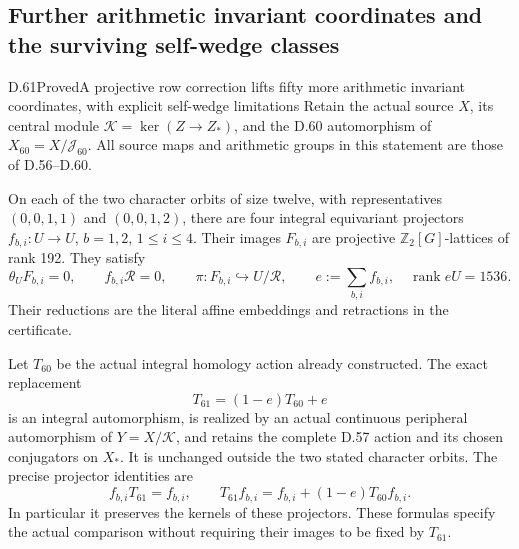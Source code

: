 \subsection{Further arithmetic invariant coordinates and the surviving self-wedge classes}

\begin{statement}{D.61}{Proved}{A projective row correction lifts fifty more arithmetic invariant coordinates, with explicit self-wedge limitations}
Retain the actual source \(X\), its central module
\(\mathcal K=\ker(Z\to Z_*)\), and the D.60
automorphism of \(X_{60}=X/\mathcal J_{60}\).
All source maps and arithmetic groups in this
statement are those of D.56--D.60.

On each of the two character orbits of size twelve,
with representatives \((0,0,1,1)\) and \((0,0,1,2)\),
there are four integral equivariant projectors
\(f_{b,i}:U\to U\), \(b=1,2\), \(1\leq i\leq4\).
Their images \(F_{b,i}\) are projective
\(\mathbb Z_2[G]\)-lattices of rank 192. They satisfy
\[
 \theta_UF_{b,i}=0,\qquad f_{b,i}\mathcal R=0,
 \qquad \pi:F_{b,i}\hookrightarrow U/\mathcal R,
 \qquad e:=\sum_{b,i}f_{b,i},\quad\operatorname{rank}eU=1536.
 \tag{D.61.1}
\]
Their reductions are the literal affine embeddings
and retractions in the certificate.

Let \(T_{60}\) be the actual integral homology
action already constructed. The exact replacement
\[
                 T_{61}=(1-e)T_{60}+e
 \tag{D.61.2}
\]
is an integral automorphism, is realized by an
actual continuous peripheral automorphism of
\(Y=X/\mathcal K\), and retains the complete
D.57 action and its chosen conjugators on \(X_*\).
It is unchanged outside the two stated character
orbits. The precise projector identities are
\[
 f_{b,i}T_{61}=f_{b,i},\qquad
 T_{61}f_{b,i}=f_{b,i}+(1-e)T_{60}f_{b,i}.
 \tag{D.61.3}
\]
In particular it preserves the kernels of these
projectors. These formulas specify the actual
comparison without requiring their images to be
fixed by \(T_{61}\).


\end{statement}
